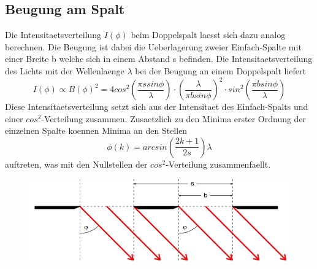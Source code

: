 \subsection{Beugung am Spalt}
Die Intensitaetsverteilung $I(\phi)$ beim Doppelspalt laesst sich dazu analog berechnen. Die Beugung ist dabei die Ueberlagerung zweier Einfach-Spalte mit einer Breite b welche sich in einem Abstand s befinden. Die Intensitaetsverteilung des Lichts mit der Wellenlaenge $\lambda$ bei der Beugung an einem Doppelspalt liefert
\begin{equation*}
    I(\phi)\propto B(\phi)^2=4cos^2(\frac{\pi ssin\phi}{\lambda})\cdot(\frac{\lambda}{\pi bsin\phi})^2\cdot sin^2(\frac{\pi bsin\phi}{\lambda})
\end{equation*}
Diese Intensitaetsverteilung setzt sich aus der Intensitaet des Einfach-Spalts und einer $cos^2$-Verteilung zusammen. Zusaetzlich zu den Minima erster Ordnung der einzelnen Spalte koennen Minima an den Stellen
\begin{equation*}
    \phi(k)=arcsin(\frac{2k+1}{2s})\lambda
\end{equation*} 
auftreten, was mit den Nullstellen der $cos^2$-Verteilung zusammenfaellt.
\begin{figure}[H]
    \centering
    \captionsetup{justification=centering}
    \includegraphics[width=15cm]{"Doppelspalt_BeugungSpalt.png"}
    \label{Fig:Doppelspalt}
\end{figure}
